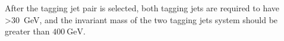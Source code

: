 After the tagging jet pair is selected, both tagging jets are required to have \pt \SI{>30}{\GeV}, and the invariant mass of the two tagging jets system should be greater than $400~\si{\GeV}$.




